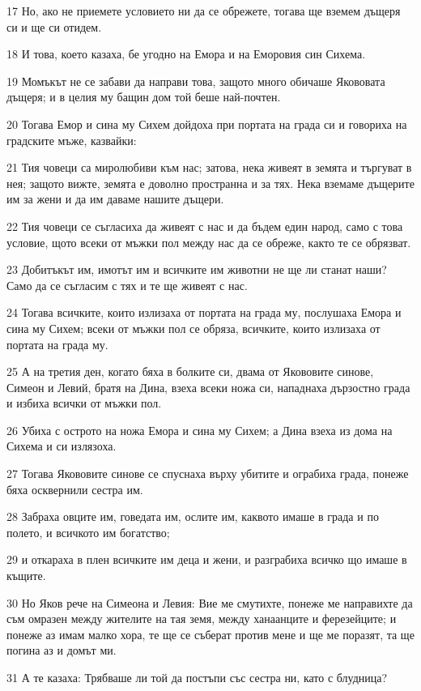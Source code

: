 \par 17 Но, ако не приемете условието ни да се обрежете, тогава ще вземем дъщеря си и ще си отидем.
\par 18 И това, което казаха, бе угодно на Емора и на Еморовия син Сихема.
\par 19 Момъкът не се забави да направи това, защото много обичаше Якововата дъщеря; и в целия му бащин дом той беше най-почтен.
\par 20 Тогава Емор и сина му Сихем дойдоха при портата на града си и говориха на градските мъже, казвайки:
\par 21 Тия човеци са миролюбиви към нас; затова, нека живеят в земята и търгуват в нея; защото вижте, земята е доволно пространна и за тях. Нека вземаме дъщерите им за жени и да им даваме нашите дъщери.
\par 22 Тия човеци се съгласиха да живеят с нас и да бъдем един народ, само с това условие, щото всеки от мъжки пол между нас да се обреже, както те се обрязват.
\par 23 Добитъкът им, имотът им и всичките им животни не ще ли станат наши? Само да се съгласим с тях и те ще живеят с нас.
\par 24 Тогава всичките, които излизаха от портата на града му, послушаха Емора и сина му Сихем; всеки от мъжки пол се обряза, всичките, които излизаха от портата на града му.
\par 25 А на третия ден, когато бяха в болките си, двама от Якововите синове, Симеон и Левий, братя на Дина, взеха всеки ножа си, нападнаха дързостно града и избиха всички от мъжки пол.
\par 26 Убиха с острото на ножа Емора и сина му Сихем; а Дина взеха из дома на Сихема и си излязоха.
\par 27 Тогава Якововите синове се спуснаха върху убитите и ограбиха града, понеже бяха осквернили сестра им.
\par 28 Забраха овците им, говедата им, ослите им, каквото имаше в града и по полето, и всичкото им богатство;
\par 29 и откараха в плен всичките им деца и жени, и разграбиха всичко що имаше в къщите.
\par 30 Но Яков рече на Симеона и Левия: Вие ме смутихте, понеже ме направихте да съм омразен между жителите на тая земя, между ханаанците и ферезейците; и понеже аз имам малко хора, те ще се съберат против мене и ще ме поразят, та ще погина аз и домът ми.
\par 31 А те казаха: Трябваше ли той да постъпи със сестра ни, като с блудница?

